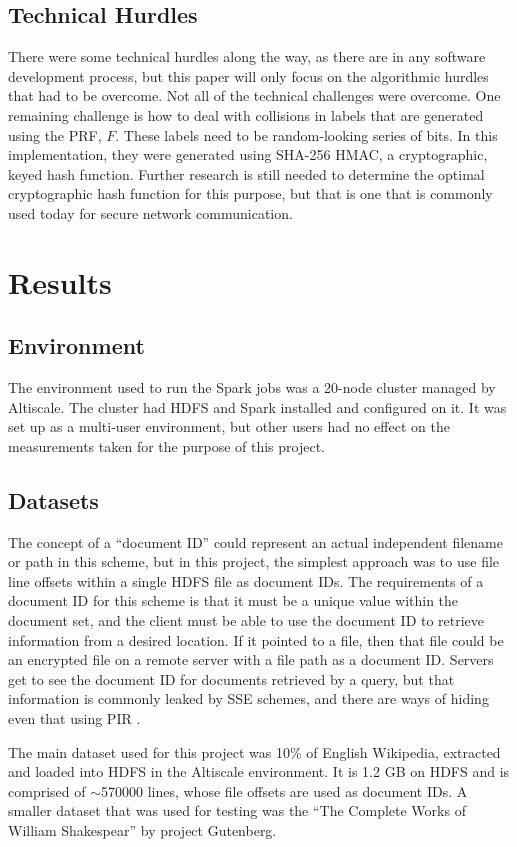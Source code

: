 \documentclass{sig-alternate-05-2015}
\begin{document}
\subsection{Technical Hurdles}
There were some technical hurdles along the way, as there are in any software development process, but this paper will only focus on the algorithmic hurdles that had to be overcome. Not all of the technical challenges were overcome. One remaining challenge is how to deal with collisions in labels that are generated using the PRF, $F$. These labels need to be random-looking series of bits. In this implementation, they were generated using SHA-256 HMAC, a cryptographic, keyed hash function. Further research is still needed to determine the optimal cryptographic hash function for this purpose, but that is one that is commonly used today for secure network communication.

\section{Results}
\subsection{Environment}
The environment used to run the Spark jobs was a 20-node cluster managed by Altiscale. The cluster had HDFS and Spark installed and configured on it. It was set up as a multi-user environment, but other users had no effect on the measurements taken for the purpose of this project.

\subsection{Datasets}
The concept of a ``document ID'' could represent an actual independent filename or path in this scheme, but in this project, the simplest approach was to use file line offsets within a single HDFS file as document IDs. The requirements of a document ID for this scheme is that it must be a unique value within the document set, and the client must be able to use the document ID to retrieve information from a desired location. If it pointed to a file, then that file could be an encrypted file on a remote server with a file path as a document ID. Servers get to see the document ID for documents retrieved by a query, but that information is commonly leaked by SSE schemes, and there are ways of hiding even that using PIR \cite{davidcashetal.2014}.

The main dataset used for this project was 10\% of English Wikipedia, extracted and loaded into HDFS in the Altiscale environment. It is 1.2 GB on HDFS and is comprised of $\sim$570000 lines, whose file offsets are used as document IDs. A smaller dataset that was used for testing was the ``The Complete Works of William Shakespear'' by project Gutenberg.
\end{document}
